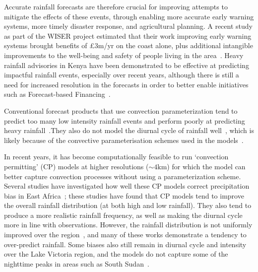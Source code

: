 \documentclass{article}
\begin{document}
Accurate rainfall forecasts are therefore crucial for improving attempts to mitigate the effects of these events, through enabling more accurate early warning systems, more timely disaster response, and agricultural planning. A recent study as part of the WISER project estimated that their work improving early warning systems brought benefits of £3m/yr on the coast alone, plus additional intangible improvements to the well-being and safety of people living in the area~\citep{watkiss_socio-economic_2021}. Heavy rainfall advisories in Kenya have been demonstrated to be effective at predicting impactful rainfall events, especially over recent years, although there is still a need for increased resolution in the forecasts in order to better enable initiatives such as Forecast-based Financing~\citep{macleod_are_2021}.


Conventional forecast products that use convection parameterization tend to predict too many low intensity rainfall events and perform poorly at predicting heavy rainfall~\citep{woodhams_what_2018, chamberlain_forecasting_2014, vogel_skill_2018, walker_skill_2019, bechtold_representing_2014, haiden_intercomparison_2012}.They also do not model the diurnal cycle of rainfall well~\citep{kim_tropical_2013, macleod_drivers_2021, bechtold_simulation_2004}, which is likely because of the convective parameterisation schemes used in the models~\citep{vogel_skill_2018, marsham_role_2013, bechtold_representing_2014}. 

In recent years, it has become computationally feasible to run `convection permitting' (CP) models at higher resolutions ($\sim4\text{km}$) for which the model can better capture convection processes without using a parameterization scheme. Several studies have investigated how well these CP models correct precipitation bias in East Africa~\citep{finney_implications_2019, cafaro_convection-permitting_2021, woodhams_what_2018, chamberlain_forecasting_2014, kendon_enhanced_2019, senior_convection-permitting_2021}; these studies have found that CP models tend to improve the overall rainfall distribution (at both high and low rainfall). They also tend to produce a more realistic rainfall frequency, as well as making the diurnal cycle more in line with observations. However, the rainfall distribution is not uniformly improved over the region~\citep{senior_convection-permitting_2021}, and many of these works demonstrate a tendency to over-predict rainfall. Some biases also still remain in diurnal cycle and intensity over the Lake Victoria region, and the models do not capture some of the nighttime peaks in areas such as South Sudan~\citep{finney_implications_2019, chamberlain_forecasting_2014}. 
\end{document}
